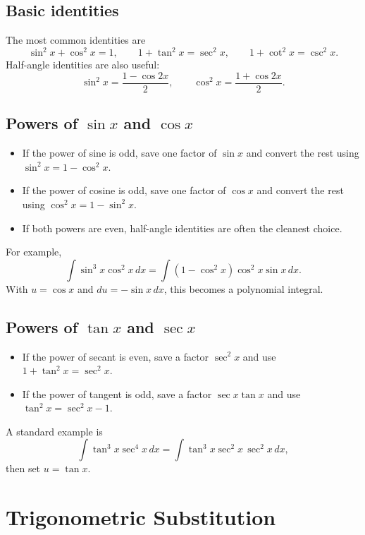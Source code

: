 \subsection*{Basic identities}

The most common identities are
$$\sin^2 x + \cos^2 x = 1, \qquad 1 + \tan^2 x = \sec^2 x, \qquad 1 + \cot^2 x = \csc^2 x.$$ 
Half-angle identities are also useful:
$$\sin^2 x = \frac{1-\cos 2x}{2}, \qquad \cos^2 x = \frac{1+\cos 2x}{2}.$$ 

\subsection*{Powers of $\sin x$ and $\cos x$}

\begin{itemize}
    \item If the power of sine is odd, save one factor of $\sin x$ and convert the rest using $\sin^2 x = 1-\cos^2 x$.
    \item If the power of cosine is odd, save one factor of $\cos x$ and convert the rest using $\cos^2 x = 1-\sin^2 x$.
    \item If both powers are even, half-angle identities are often the cleanest choice.
\end{itemize}

For example,
$$\int \sin^3 x\cos^2 x\,dx = \int (1-\cos^2 x)\cos^2 x\sin x\,dx.$$ 
With $u=\cos x$ and $du=-\sin x\,dx$, this becomes a polynomial integral.

\subsection*{Powers of $\tan x$ and $\sec x$}

\begin{itemize}
    \item If the power of secant is even, save a factor $\sec^2 x$ and use $1+\tan^2 x=\sec^2 x$.
    \item If the power of tangent is odd, save a factor $\sec x\tan x$ and use $\tan^2 x=\sec^2 x-1$.
\end{itemize}

A standard example is
$$\int \tan^3 x\sec^4 x\,dx = \int \tan^3 x\sec^2 x\,\sec^2 x\,dx,$$
then set $u=\tan x$.

\section*{Trigonometric Substitution}

